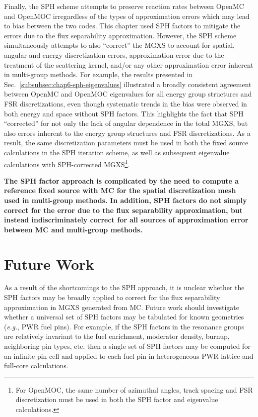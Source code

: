 Finally, the \ac{SPH} scheme attempts to preserve reaction rates between OpenMC and OpenMOC irregardless of the types of approximation errors which may lead to bias between the two codes. This chapter used \ac{SPH} factors to mitigate the errors due to the flux separability approximation. However, the \ac{SPH} scheme simultaneously attempts to also ``correct'' the \ac{MGXS} to account for spatial, angular and energy discretization errors, approximation error due to the treatment of the scattering kernel, and/or any other approximation error inherent in multi-group methods. For example, the results presented in Sec.~\ref{subsubsec:chap6-sph-eigenvalues} illustrated a broadly consistent agreement between OpenMC and OpenMOC eigenvalues for all energy group structures and \ac{FSR} discretizations, even though systematic trends in the bias were observed in both energy and space without \ac{SPH} factors. This highlights the fact that \ac{SPH} ``corrected'' for not only the lack of angular dependence in the total \ac{MGXS}, but also errors inherent to the energy group structures and \ac{FSR} discretizations. As a result, the same discretization parameters must be used in both the fixed source calculations in the \ac{SPH} iteration scheme, as well as subsequent eigenvalue calculations with \ac{SPH}-corrected \ac{MGXS}\footnote{For OpenMOC, the same number of azimuthal angles, track spacing and \ac{FSR} discretization must be used in both the \ac{SPH} factor and eigenvalue calculations.}.

\clearpage

\begin{emphbox}
\textbf{The \ac{SPH} factor approach is complicated by the need to compute a reference fixed source with \ac{MC} for the spatial discretization mesh used in multi-group methods. In addition, \ac{SPH} factors do not simply correct for the error due to the flux separability approximation, but instead indiscriminately correct for all sources of approximation error between \ac{MC} and multi-group methods.}
\end{emphbox}

\section{Future Work}
\label{sec:chap6-sph-future}

As a result of the shortcomings to the \ac{SPH} approach, it is unclear whether the \ac{SPH} factors may be broadly applied to correct for the flux separability approximation in \ac{MGXS} generated from \ac{MC}. Future work should investigate whether a universal set of \ac{SPH} factors may be tabulated for known geometries (\textit{e.g.}, \ac{PWR} fuel pins). For example, if the \ac{SPH} factors in the resonance groups are relatively invariant to the fuel enrichment, moderator density, burnup, neighboring pin types, etc. then a single set of \ac{SPH} factors may be computed for an infinite pin cell and applied to each fuel pin in heterogeneous \ac{PWR} lattice and full-core calculations. 

